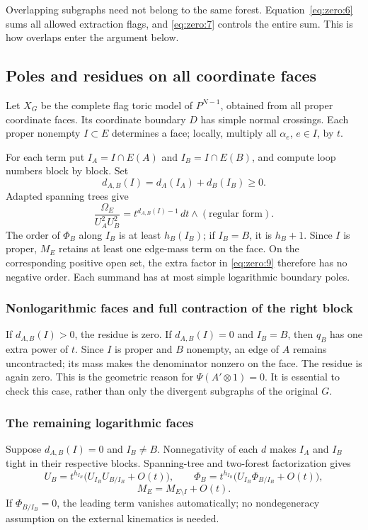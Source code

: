\documentclass[11pt,a4paper,oneside]{article}
\theoremstyle{plain}
\theoremstyle{definition}
\theoremstyle{remark}
\numberwithin{equation}{section}
\begin{document}
Overlapping subgraphs need not belong to the same forest. Equation~\eqref{eq:zero:6} sums all allowed extraction flags, and \eqref{eq:zero:7} controls the entire sum. This is how overlaps enter the argument below.

\subsection{Poles and residues on all coordinate faces}\label{sec:zero:5}
Let \(X_G\) be the complete flag toric model of \(P^{N-1}\), obtained from all proper coordinate faces. Its coordinate boundary $D$ has simple normal crossings. Each proper nonempty \(I\subset E\) determines a face; locally, multiply all \(\alpha_e\), \(e\in I\), by $t$.

For each term put \(I_A=I\cap E(A)\) and \(I_B=I\cap E(B)\), and compute loop numbers block by block. Set
\begin{equation}
d_{A,B}(I)=d_A(I_A)+d_B(I_B)\geq0.
\end{equation}
Adapted spanning trees give
\begin{equation}
\frac{\Omega_E}{U_A^2U_B^2}
       =t^{d_{A,B}(I)-1}\,dt\wedge(\text{regular form}).            \label{eq:zero:12}
\end{equation}
The order of \(\Phi_B\) along \(I_B\) is at least \(h_B(I_B)\); if \(I_B=B\), it is \(h_B+1\). Since $I$ is proper, \(M_E\) retains at least one edge-mass term on the face. On the corresponding positive open set, the extra factor in \eqref{eq:zero:9} therefore has no negative order. Each summand has at most simple logarithmic boundary poles.

\subsubsection{Nonlogarithmic faces and full contraction of the right block}\label{sec:zero:5.1}
If \(d_{A,B}(I)>0\), the residue is zero. If \(d_{A,B}(I)=0\) and \(I_B=B\), then \(q_B\) has one extra power of $t$. Since $I$ is proper and $B$ nonempty, an edge of $A$ remains uncontracted; its mass makes the denominator nonzero on the face. The residue is again zero. This is the geometric reason for \(\Psi(A'\otimes1)=0\). It is essential to check this case, rather than only the divergent subgraphs of the original $G$.

\subsubsection{The remaining logarithmic faces}\label{sec:zero:5.2}
Suppose \(d_{A,B}(I)=0\) and \(I_B\ne B\). Nonnegativity of each $d$ makes \(I_A\) and \(I_B\) tight in their respective blocks. Spanning-tree and two-forest factorization gives
\begin{equation}
U_B=t^{h_{I_B}}\bigl(U_{I_B}U_{B/I_B}+O(t)\bigr),\qquad
 \Phi_B=t^{h_{I_B}}\bigl(U_{I_B}\Phi_{B/I_B}+O(t)\bigr),         \label{eq:zero:13}
\end{equation}
\begin{equation}
M_E=M_{E\setminus I}+O(t).
\end{equation}
If \(\Phi_{B/I_B}=0\), the leading term vanishes automatically; no nondegeneracy assumption on the external kinematics is needed.
\end{document}

